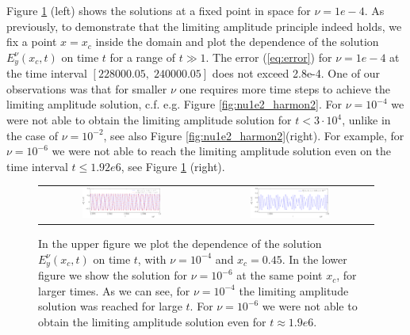Figure \ref{fig:nu1e4_harmon} (left) shows the solutions at a fixed point in space for $\nu=1e-4$. As previously, 
to demonstrate that the limiting amplitude principle indeed holds, we fix a point $x=x_c$ 
inside the domain and plot 
the dependence of the solution $E_{y}^{\nu}(x_c,t)$ on time $t$ for a range of $t\gg 1$. 
The error (\ref{eq:error}) for $\nu=1e-4$ at the time interval $[228000.05,\; 240000.05]$ does not exceed 2.8e-4. 
One of our observations was that for smaller $\nu$ one requires more time steps to achieve the limiting amplitude solution, 
c.f. e.g. Figure \ref{fig:nu1e2_harmon2}. 
For $\nu=10^{-4}$ we were not able to obtain the limiting amplitude solution for $t<3\cdot 10^{4}$, unlike in the case of $\nu=10^{-2}$, 
see also Figure \ref{fig:nu1e2_harmon2}(right). 
For example, for $\nu=10^{-6}$ we were not able to reach the limiting amplitude solution even on the time interval $t\leq 1.92e6$, 
see Figure \ref{fig:nu1e4_harmon} (right). 
\begin{figure}
\begin{tabular}{cc}
 \includegraphics[width=0.5\textwidth]{airy/figure_nu1e4-crop.pdf}&
 \includegraphics[width=0.5\textwidth]{airy/figure_nu1e6-crop.pdf}\\
\end{tabular}
\caption{In the upper figure we plot the dependence of the solution $E_{y}^{\nu}(x_c,t)$ on time $t$, with $\nu=10^{-4}$ and $x_c=0.45$. 
In the lower figure we show the solution for $\nu=10^{-6}$ at the same point $x_c$, for larger times. As we can see, for 
$\nu=10^{-4}$ the limiting amplitude solution was reached for large $t$. For $\nu=10^{-6}$ we were not able 
to obtain the limiting amplitude solution even for $t\approx 1.9e6$. }
  \label{fig:nu1e4_harmon}
\end{figure}

